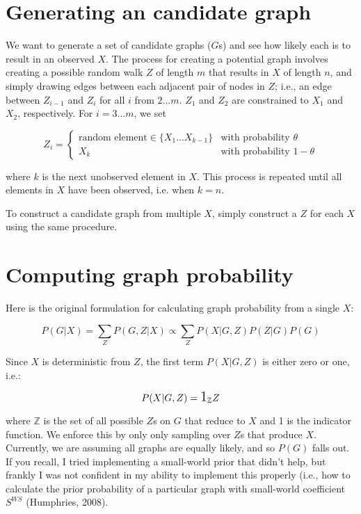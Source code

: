 \documentclass{article}
\begin{document}
\section{Generating an candidate graph}
We want to generate a set of candidate graphs ($G$s) and see how likely each is
to result in an observed $X$. The process for creating a potential graph
involves creating a possible random walk $Z$ of length $m$ that results
in $X$ of length $n$, and simply drawing edges between each adjacent
pair of nodes in $Z$; i.e., an edge between $Z_{i-1}$ and $Z_i$ for all
$i$ from $2...m$. $Z_1$ and $Z_2$ are constrained to $X_1$ and $X_2$,
respectively. For $i=3...m$, we set

\begin{equation}
    Z_i = 
    \begin{cases}
        \text{random element} \in \{X_1...X_{k-1}\} & \text{with probability } \theta \\
        X_{k}                 & \text{with probability } 1-\theta
    \end{cases}
\end{equation}

where $k$ is the next unobserved element in $X$. This process is repeated
until all elements in $X$ have been observed, i.e. when $k=n$.

\vspace{5mm}

To construct a candidate graph from multiple $X$, simply construct a
$Z$ for each $X$ using the same procedure.

\section{Computing graph probability}

Here is the original formulation for calculating graph probability from a single
$X$:

\begin{equation}
    \label{eq:likelihood_onex}
    P(G|X)=\sum_{Z}{P(G,Z|X)} \propto \sum_{Z}P(X|G,Z)P(Z|G)P(G)
\end{equation}

Since $X$ is deterministic from $Z$, the first term
$P(X|G,Z)$ is either zero or one, i.e.:

\begin{equation}
    P(X|G,Z)=\text{\Large{1}}_{\mathbb{Z}}{Z}
\end{equation}

where $\mathbb{Z}$ is the set of all possible $Z$s on $G$ that reduce to $X$
and \large{1} \normalsize is the indicator function. We enforce this by only
only sampling over $Z$s that produce $X$. Currently, we are assuming all graphs
are equally likely, and so $P(G)$ falls out. If you recall, I tried
implementing a small-world prior that didn't help, but frankly I was not
confident in my ability to implement this properly (i.e., how to calculate the
prior probability of a particular graph with small-world coefficient
$S^{\scriptscriptstyle{WS}}$ (Humphries, 2008).
\end{document}

